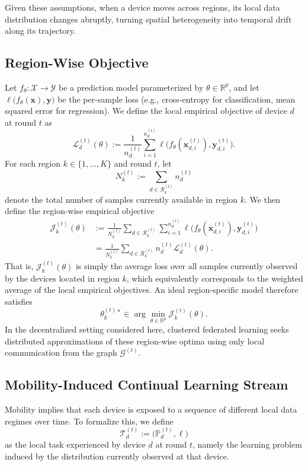 \documentclass[conference]{IEEEtran}
\theoremstyle{plain}
\theoremstyle{definition}
\begin{document}
Given these assumptions,
 when a device moves across regions,
 its local data distribution changes abruptly,
 turning spatial heterogeneity into temporal drift along its trajectory.

\subsection{Region-Wise Objective}\label{sec:formalization-objective}
Let $f_{\theta} : \mathcal{X} \to \mathcal{Y}$ be a prediction model parameterized by $\theta \in \mathbb{R}^p$, 
 and let $\ell\bigl(f_{\theta}(\mathbf{x}), \mathbf{y}\bigr)$ be the per-sample loss (e.g., cross-entropy for classification, mean squared error for regression).
We define the local empirical objective of device $d$ at round $t$ as
\[
    \mathcal{L}_d^{(t)}(\theta)
    := \frac{1}{n_d^{(t)}} \sum_{i=1}^{n_d^{(t)}}
    \ell\bigl(f_\theta(\mathbf{x}_{d,i}^{(t)}), \mathbf{y}_{d,i}^{(t)}\bigr).
\]
For each region $k \in \{1,\dots,K\}$ and round $t$, let
\[
    N_k^{(t)} := \sum_{d \in \mathcal{R}_k^{(t)}} n_d^{(t)}
\]
denote the total number of samples currently available in region $k$.
We then define the region-wise empirical objective
\[
    \begin{aligned}
        \mathcal{J}_k^{(t)}(\theta)
        &:= \frac{1}{N_k^{(t)}}
        \sum_{d \in \mathcal{R}_k^{(t)}} \sum_{i=1}^{n_d^{(t)}}
        \ell\bigl(f_\theta(\mathbf{x}_{d,i}^{(t)}), \mathbf{y}_{d,i}^{(t)}\bigr) \\
        &= \frac{1}{N_k^{(t)}} \sum_{d \in \mathcal{R}_k^{(t)}} n_d^{(t)} \mathcal{L}_d^{(t)}(\theta).
    \end{aligned}
\]
That is, 
$\mathcal{J}_k^{(t)}(\theta)$ is simply the average loss over all samples currently observed by the devices located in region $k$, which equivalently corresponds to the weighted average of the local empirical objectives.
An ideal region-specific model therefore satisfies
\[
    \theta_k^{(t)\star} \in \arg\min_{\theta \in \mathbb{R}^p} \mathcal{J}_k^{(t)}(\theta).
\]
In the decentralized setting considered here, 
 clustered federated learning seeks distributed approximations of these region-wise optima using only local communication from the graph $\mathcal{G}^{(t)}$.

\subsection{Mobility-Induced Continual Learning Stream}\label{sec:continual-learning-stream}
Mobility implies that each device is exposed to a sequence of different local data regimes over time.
To formalize this, we define
\[
    \mathcal{T}_d^{(t)} := \bigl(\mathbb{P}_d^{(t)}, \ell\bigr)
\]
as the local task experienced by device $d$ at round $t$, 
 namely the learning problem induced by the distribution currently observed at that device.
\end{document}
